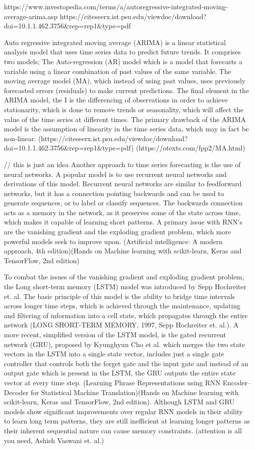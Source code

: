 https://www.investopedia.com/terms/a/autoregressive-integrated-moving-average-arima.asp
https://citeseerx.ist.psu.edu/viewdoc/download?doi=10.1.1.462.3756&rep=rep1&type=pdf

Auto regressive integrated moving average (ARIMA) is a linear statistical analysis model that uses time series data to predict future trends. It comprises two models; The Auto-regression (AR) model which is a model that forecasts a variable using a linear combination of past values of the same variable. The moving average model (MA), which instead of using past values, uses previously forecasted errors (residuals) to make current predictions. 
The final element in the ARIMA model, the I is the differencing of observations in order to achieve stationarity, which is done to remove trends or seasonality, which will affect the value of the time series at different times. The primary drawback of the ARIMA model is the assumption of linearity in the time series data, which may in fact be non-linear. (https://citeseerx.ist.psu.edu/viewdoc/download?doi=10.1.1.462.3756&rep=rep1&type=pdf)
(https://otexts.com/fpp2/MA.html)

// this is just an idea
Another approach to time series forecasting is the use of neural networks. A popular model is to use recurrent neural networks and derivations of this model. Recurrent neural networks are similar to feedforward networks, but it has a connection pointing backwards and can be used to generate sequences, or to label or classify sequences. The backwards connection acts as a memory in the network, as it preserves some of the state across time, which makes it capable of learning short patterns. A primary issue with RNN’s are the vanishing gradient and the exploding gradient problem, which more powerful models seek to improve upon. (Artificial intelligence: A modern approach, 4th edition)(Hands on Machine learning with scikit-learn, Keras and TensorFlow, 2nd edition)

To combat the issues of the vanishing gradient and exploding gradient problem, the Long short-term memory (LSTM) model was introduced by Sepp Hochreiter et. al. The basic principle of this model is the ability to bridge time intervals across longer time steps, which is achieved through the maintenance, updating and filtering of information into a cell state, which propagates through the entire network (LONG SHORT-TERM MEMORY, 1997, Sepp Hochreiter et. al.). A more recent, simplified version of the LSTM model, is the gated recurrent network (GRU), proposed by Kyunghyun Cho et al. which merges the two state vectors in the LSTM into a single state vector, includes just a single gate controller that controls both the forget gate and the input gate and instead of an output gate which is present in the LSTM, the GRU outputs the entire state vector at every time step. (Learning Phrase Representations using RNN Encoder–Decoder for Statistical Machine Translation)(Hands on Machine learning with scikit-learn, Keras and TensorFlow, 2nd edition).
Although LSTM and GRU models show significant improvements over regular RNN models in their ability to learn long term patterns, they are still inefficient at learning longer patterns as their inherent sequential nature can cause memory constraints. (attention is all you need, Ashish Vaswani et. al.)
